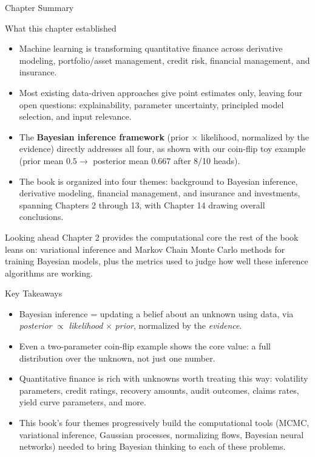 \documentclass[aspectratio=169,10pt]{beamer}
\begin{document}
\begin{frame}[allowframebreaks]{Chapter Summary}
  \begin{block}{What this chapter established}
    \begin{itemize}
      \item Machine learning is transforming quantitative finance across
      derivative modeling, portfolio/asset management, credit risk,
      financial management, and insurance.
      \item Most existing data-driven approaches give point estimates only,
      leaving four open questions: explainability, parameter uncertainty,
      principled model selection, and input relevance.
      \item The \textbf{Bayesian inference framework} (prior $\times$
      likelihood, normalized by the evidence) directly addresses all four,
      as shown with our coin-flip toy example (prior mean $0.5 \to$
      posterior mean $0.667$ after 8/10 heads).
      \item The book is organized into four themes: background to Bayesian
      inference, derivative modeling, financial management, and insurance
      and investments, spanning Chapters 2 through 13, with Chapter 14
      drawing overall conclusions.
    \end{itemize}
  \end{block}
  \begin{block}{Looking ahead}
    Chapter 2 provides the computational core the rest of the book leans
    on: variational inference and Markov Chain Monte Carlo methods for
    training Bayesian models, plus the metrics used to judge how well these
    inference algorithms are working.
  \end{block}
\end{frame}

\begin{frame}{Key Takeaways}
  \begin{itemize}
    \item Bayesian inference = updating a belief about an unknown using
    data, via \emph{posterior} $\propto$ \emph{likelihood} $\times$
    \emph{prior}, normalized by the \emph{evidence}.
    \item Even a two-parameter coin-flip example shows the core value:
    a full distribution over the unknown, not just one number.
    \item Quantitative finance is rich with unknowns worth treating this
    way: volatility parameters, credit ratings, recovery amounts, audit
    outcomes, claims rates, yield curve parameters, and more.
    \item This book's four themes progressively build the computational
    tools (MCMC, variational inference, Gaussian processes, normalizing
    flows, Bayesian neural networks) needed to bring Bayesian thinking to
    each of these problems.
  \end{itemize}
\end{frame}
\end{document}
